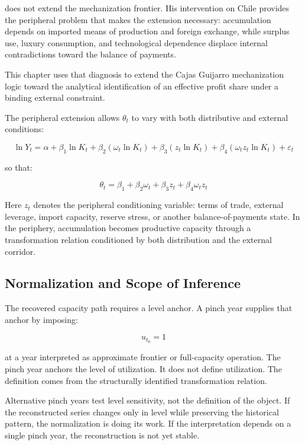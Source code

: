 \citet{Kaldor1959} does not extend the mechanization frontier. His intervention on Chile provides the peripheral problem that makes the extension necessary: accumulation depends on imported means of production and foreign exchange, while surplus use, luxury consumption, and technological dependence displace internal contradictions toward the balance of payments.

This chapter uses that diagnosis to extend the Cajas Guijarro mechanization logic toward the analytical identification of an effective profit share under a binding external constraint.

The peripheral extension allows $\theta_t$ to vary with both distributive and external conditions:

\begin{equation}
\ln Y_t
=
\alpha
+
\beta_1 \ln K_t
+
\beta_2(\omega_t \ln K_t)
+
\beta_3(z_t \ln K_t)
+
\beta_4(\omega_t z_t \ln K_t)
+
\varepsilon_t
\end{equation}

so that:

\begin{equation}
\theta_t
=
\beta_1
+
\beta_2\omega_t
+
\beta_3z_t
+
\beta_4\omega_t z_t
\end{equation}

Here $z_t$ denotes the peripheral conditioning variable: terms of trade, external leverage, import capacity, reserve stress, or another balance-of-payments state. In the periphery, accumulation becomes productive capacity through a transformation relation conditioned by both distribution and the external corridor.

\subsection{Normalization and Scope of Inference}

The recovered capacity path requires a level anchor. A pinch year supplies that anchor by imposing:

\begin{equation}
u_{t_0}=1
\end{equation}

at a year interpreted as approximate frontier or full-capacity operation. The pinch year anchors the level of utilization. It does not define utilization. The definition comes from the structurally identified transformation relation.

Alternative pinch years test level sensitivity, not the definition of the object. If the reconstructed series changes only in level while preserving the historical pattern, the normalization is doing its work. If the interpretation depends on a single pinch year, the reconstruction is not yet stable.


